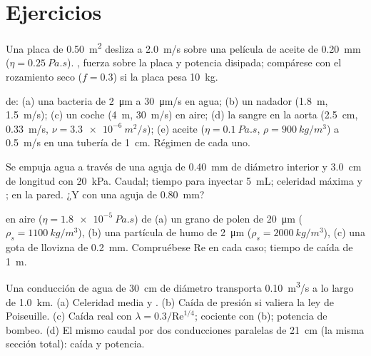\section{Ejercicios}

\begin{exercise}[$\star$]\label{exo:b2:viscous-flows:1}
Una placa de \qty{0.50}{m^2} desliza a \qty{2.0}{m/s} sobre una película de
aceite de \qty{0.20}{mm} ($\eta = \qty{0.25}{Pa.s}$). ,
fuerza sobre la placa y potencia disipada; compárese con el rozamiento
seco ($f = 0.3$) si la placa pesa \qty{10}{kg}.
\end{exercise}

\begin{exercise}[$\star$]\label{exo:b2:viscous-flows:2}
 de: (a) una bacteria de \qty{2}{\micro m} a \qty{30}{\micro m/s} en
agua; (b) un nadador (\qty{1.8}{m}, \qty{1.5}{m/s}); (c) un coche (\qty{4}{m},
\qty{30}{m/s}) en aire; (d) la sangre en la aorta (\qty{2.5}{cm}, \qty{0.33}{m/s},
$\nu = \qty{3.3e-6}{m^2/s}$); (e) aceite ($\eta = \qty{0.1}{Pa.s}$, $\rho =
\qty{900}{kg/m^3}$) a \qty{0.5}{m/s} en una tubería de \qty{1}{cm}. Régimen de cada uno.
\end{exercise}

\begin{exercise}[$\star$]\label{exo:b2:viscous-flows:3}
Se empuja agua a través de una aguja de \qty{0.40}{mm} de diámetro interior
y \qty{3.0}{cm} de longitud con \qty{20}{kPa}. Caudal; tiempo para inyectar
\qty{5}{mL}; celeridad máxima y ;  en la pared. ¿Y con una aguja de \qty{0.80}{mm}?
\end{exercise}

\begin{exercise}[$\star$]\label{exo:b2:viscous-flows:4}
 en aire ($\eta = \qty{1.8e-5}{Pa.s}$) de (a) un grano de polen de \qty{20}{\micro m}
($\rho_s = \qty{1100}{kg/m^3}$), (b) una partícula de humo de \qty{2}{\micro m}
($\rho_s = \qty{2000}{kg/m^3}$), (c) una gota de llovizna de \qty{0.2}{mm}.
Compruébese $\mathrm{Re}$ en cada caso; tiempo de caída de \qty{1}{m}.
\end{exercise}

\begin{exercise}[$\star\star$]\label{exo:b2:viscous-flows:5}
Una conducción de agua de \qty{30}{cm} de diámetro transporta \qty{0.10}{m^3/s} a lo largo de
\qty{1.0}{km}. (a) Celeridad media y . (b) Caída de presión si
valiera la ley de Poiseuille. (c) Caída real con $\lambda = 0.3/\mathrm{Re}^{1/4}$;
cociente con (b); potencia de bombeo. (d) El mismo caudal por dos
conducciones paralelas de \qty{21}{cm} (la misma sección total): caída y potencia.
\end{exercise}

